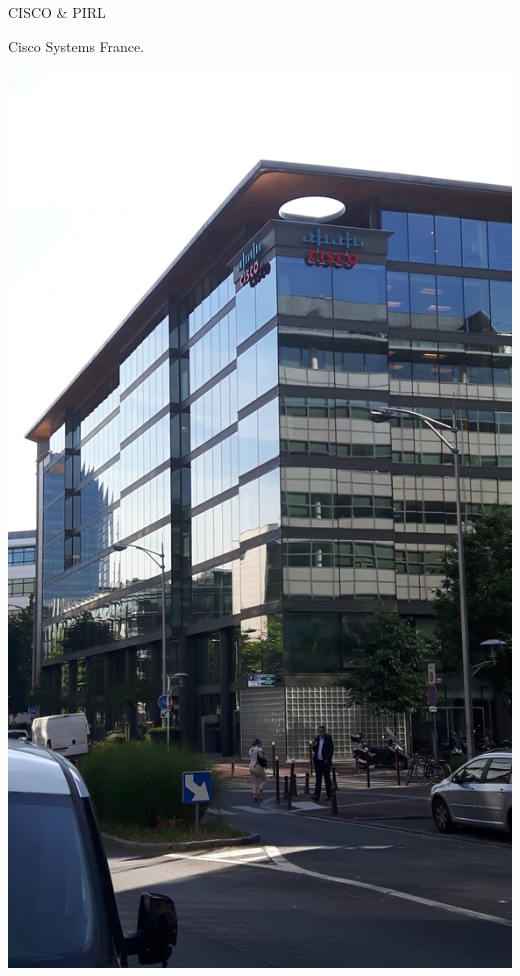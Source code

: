 \documentclass[8pt]{beamer}
\newcommand{\1}{\mathbbm 1}
\begin{document}
\begin{frame}{CISCO \& PIRL}

Cisco Systems France.

\begin{center}
\includegraphics[scale=0.07]{figures/cisco.jpg}
\end{center}


\end{frame}
\end{document}
